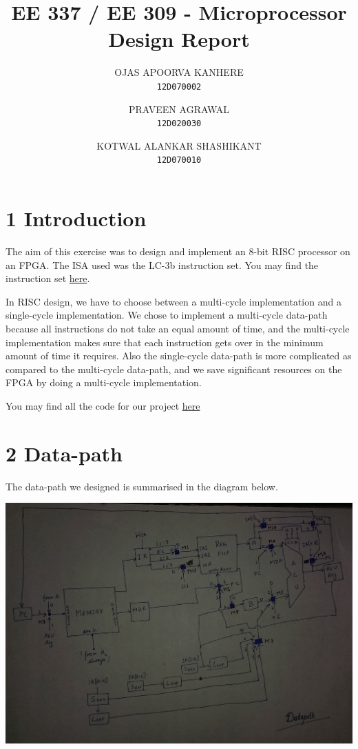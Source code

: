\documentclass[11pt]{report}
\author{
  OJAS APOORVA KANHERE\\
  \texttt{12D070002}
  \and
  PRAVEEN AGRAWAL\\
  \texttt{12D020030}
  \and
  KOTWAL ALANKAR SHASHIKANT\\
  \texttt{12D070010}
}
\title{EE 337 / EE 309 - Microprocessor Design Report}
\begin{document}
\maketitle

\section*{1 Introduction}
The aim of this exercise was to design and implement an 8-bit RISC processor on an FPGA. The ISA used was the LC-3b instruction set. You may find the instruction set \href{http://users.ece.utexas.edu/~patt/11s.460N/handouts/new_byte.pdf}{here}.

In RISC design, we have to choose between a multi-cycle implementation and a single-cycle implementation. We chose to implement a multi-cycle data-path because all instructions do not take an equal amount of time, and the multi-cycle implementation makes sure that each instruction gets over in the minimum amount of time it requires. Also the single-cycle data-path is more complicated as compared to the multi-cycle data-path, and we save significant resources on the FPGA by doing a multi-cycle implementation.

You may find all the code for our project \href{http://www.github.com/AlankarKotwal/lc-3b-processor}{here}

\section*{2 Data-path}
The data-path we designed is summarised in the diagram below.\newline
\newline
\centerline{\includegraphics[scale=0.20]{datapath.jpg}}
\newline
\end{document}
